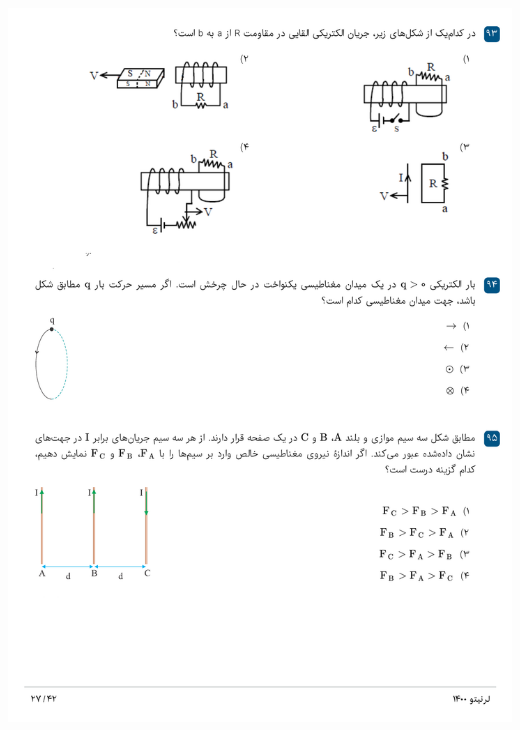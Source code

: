 \documentclass{book}
\begin{document}
\includegraphics[width=\textwidth]{"pages/27"}
\end{document}
